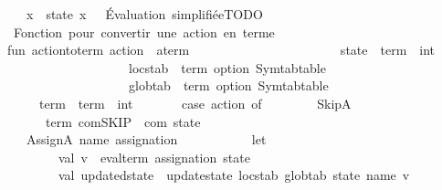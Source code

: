 \begin{isabellebody}
\ \ \ \ \ \ {\isacharbar}{\kern0pt}\ x\ {\isacharequal}{\kern0pt}{\isachargreater}{\kern0pt}\ state\ x\ \ {\isacharparenleft}{\kern0pt}{\isacharasterisk}{\kern0pt}\ Évaluation\ simplifiée{\isacharcomma}{\kern0pt}TODO\ {\isacharasterisk}{\kern0pt}{\isacharparenright}{\kern0pt}\isanewline
\isanewline
\ \ \ \ {\isacharparenleft}{\kern0pt}{\isacharasterisk}{\kern0pt}\ Fonction\ pour\ convertir\ une\ action\ en\ terme\ {\isacharasterisk}{\kern0pt}{\isacharparenright}{\kern0pt}\isanewline
\ \ \ \ fun\ action{\isacharunderscore}{\kern0pt}to{\isacharunderscore}{\kern0pt}term\ {\isacharparenleft}{\kern0pt}action\ {\isacharcolon}{\kern0pt}\ a{\isacharunderscore}{\kern0pt}term{\isacharparenright}{\kern0pt}\isanewline
\ \ \ \ \ \ \ \ \ \ \ \ \ \ \ \ \ \ \ \ \ \ \ {\isacharparenleft}{\kern0pt}state\ {\isacharcolon}{\kern0pt}\ term\ {\isacharminus}{\kern0pt}{\isachargreater}{\kern0pt}\ int{\isacharparenright}{\kern0pt}\isanewline
\ \ \ \ \ \ \ \ \ \ \ \ \ \ \ \ \ \ \ \ \ \ \ {\isacharparenleft}{\kern0pt}locstab\ {\isacharcolon}{\kern0pt}\ term\ option\ Symtab{\isachardot}{\kern0pt}table{\isacharparenright}{\kern0pt}\isanewline
\ \ \ \ \ \ \ \ \ \ \ \ \ \ \ \ \ \ \ \ \ \ \ {\isacharparenleft}{\kern0pt}globtab\ {\isacharcolon}{\kern0pt}\ term\ option\ Symtab{\isachardot}{\kern0pt}table{\isacharparenright}{\kern0pt}\isanewline
\ \ \ \ \ \ \ \ {\isacharcolon}{\kern0pt}\ term\ {\isacharasterisk}{\kern0pt}\ {\isacharparenleft}{\kern0pt}term\ {\isacharminus}{\kern0pt}{\isachargreater}{\kern0pt}\ int{\isacharparenright}{\kern0pt}\ {\isacharequal}{\kern0pt}\isanewline
\ \ \ \ \ \ case\ action\ of\isanewline
\ \ \ \ \ \ \ \ SkipA\ {\isacharequal}{\kern0pt}{\isachargreater}{\kern0pt}\ \isanewline
\ \ \ \ \ \ \ \ \ \ {\isacharparenleft}{\kern0pt}{\isacharat}{\kern0pt}{\isacharbraceleft}{\kern0pt}term\ {\isachardoublequote}{\kern0pt}com{\isachardot}{\kern0pt}SKIP\ {\isacharcolon}{\kern0pt}{\isacharcolon}{\kern0pt}\ com{\isachardoublequote}{\kern0pt}{\isacharbraceright}{\kern0pt}{\isacharcomma}{\kern0pt}\ state{\isacharparenright}{\kern0pt}\isanewline
\ \ \ \ \ \ \ \ \ \ \isanewline
\ \ \ \ \ \ {\isacharbar}{\kern0pt}\ AssignA\ {\isacharparenleft}{\kern0pt}name{\isacharcomma}{\kern0pt}\ assignation{\isacharparenright}{\kern0pt}\ {\isacharequal}{\kern0pt}{\isachargreater}{\kern0pt}\isanewline
\ \ \ \ \ \ \ \ \ \ let\isanewline
\ \ \ \ \ \ \ \ \ \ \ \ val\ v\ {\isacharequal}{\kern0pt}\ eval{\isacharunderscore}{\kern0pt}term\ assignation\ state\isanewline
\ \ \ \ \ \ \ \ \ \ \ \ val\ updated{\isacharunderscore}{\kern0pt}state\ {\isacharequal}{\kern0pt}\ update{\isacharunderscore}{\kern0pt}state\ locstab\ globtab\ state\ name\ v\isanewline

\end{isabellebody}
